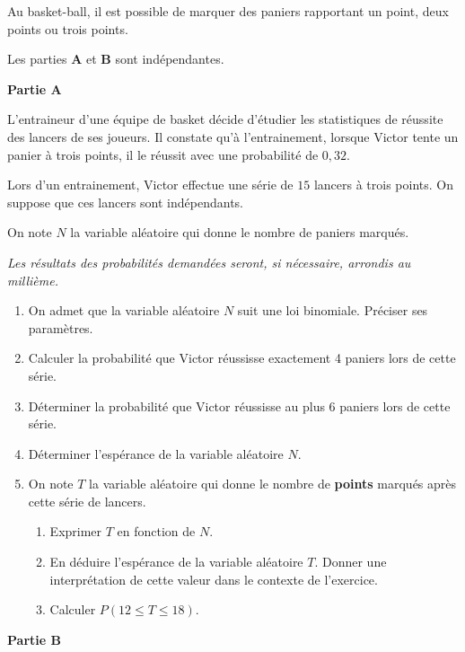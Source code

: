 \medskip

Au basket-ball, il est possible de marquer des paniers rapportant un point, deux points ou trois points.

Les parties \textbf{A} et \textbf{B} sont indépendantes.

\bigskip

\textbf{Partie A}

\medskip
L'entraineur d'une équipe de basket décide d'étudier les statistiques de réussite des lancers de ses joueurs. Il constate qu'à l'entrainement, lorsque Victor tente un panier à trois points, il le réussit avec une probabilité de $0,32$.

Lors d'un entrainement, Victor effectue une série de $15$ lancers à trois points. On suppose que ces lancers sont indépendants.

\medskip

On note $N$ la variable aléatoire qui donne le nombre de paniers marqués.

\medskip

\emph{Les résultats des probabilités demandées seront, si nécessaire, arrondis au millième.}

\begin{enumerate}
\item On admet que la variable aléatoire $N$ suit une loi binomiale. Préciser ses paramètres.
\item Calculer la probabilité que Victor réussisse exactement 4 paniers lors de cette série.
\item Déterminer la probabilité que Victor réussisse au plus 6 paniers lors de cette série.
\item Déterminer l'espérance de la variable aléatoire $N$.
\item On note $T$ la variable aléatoire qui donne le nombre de \textbf{points} marqués après cette série de lancers.
	\begin{enumerate}
		\item Exprimer $T$ en fonction de $N$.
		\item En déduire l'espérance de la variable aléatoire $T$. Donner une interprétation de cette valeur dans le contexte de l'exercice.
		\item Calculer $P(12 \leqslant T \leqslant 18)$.
	\end{enumerate}
\end{enumerate}

\medskip

\textbf{Partie B}

\medskip


